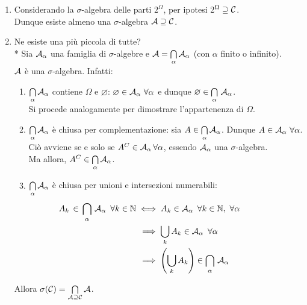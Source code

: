 \begin{dimo}
  \Fixvmode
  \begin{enumerate}
    \item Considerando la $\sigma$-algebra delle parti $2^\Omega$, per ipotesi 2$^\Omega \supseteq \mathcal C$. \\
    Dunque esiste almeno una $\sigma$-algebra $\mathcal A \supseteq \mathcal C$.
    \item Ne esiste una più piccola di tutte? \\*
      Sia $\mathcal A_\alpha$ una famiglia di $\sigma$-algebre e $\mathcal A = \bigcap\limits_{\alpha}^{} \mathcal A_\alpha$ (con $\alpha$ finito o infinito). \\
    $\mathcal A$ è una $\sigma$-algebra. Infatti:
      \begin{enumerate}
        \item $\bigcap\limits_{\alpha} \mathcal A_\alpha$ contiene $\Omega$ e $\varnothing$:  $\varnothing \in \mathcal A_\alpha \ \forall \alpha$ e dunque $\varnothing \in \bigcap\limits_{\alpha}^{} \, \mathcal A_\alpha$. \\
        Si procede analogamente per dimostrare l'appartenenza di $\Omega$.
        \item $\bigcap\limits_{\alpha}^{} \mathcal A_\alpha$ è chiusa per complementazione: sia $A \in \bigcap\limits_{\alpha} \mathcal A_\alpha$.
          Dunque $A \in \mathcal A_\alpha \ \forall \alpha$. \\
      Ciò avviene se e solo se $A^C \in \mathcal A_\alpha \, \forall \alpha$, essendo $\mathcal A_\alpha$ una $\sigma$-algebra. \\
          Ma allora, $A^C \in \bigcap\limits_{\alpha}^{} \mathcal A_\alpha$.
        \item $\bigcap\limits_{\alpha}^{} \mathcal A_\alpha$ è chiusa per unioni e intersezioni numerabili:
          \begin{align*}
            A_k \,\in\, \bigcap_{\alpha} \, \Ac_\alpha \enspace \forall k \in \NN
            &\iff A_k \in \Ac_\alpha \enspace \forall k \in \NN, \ \forall \alpha \qquad \qquad\\
            &\, \implies \bigcup_k A_k \in \Ac_\alpha \enspace \forall \alpha \\
            &\, \implies \left( \bigcup\limits_{k}^{} A_k \right) \in \bigcap\limits_{\alpha}^{} \, \Ac_\alpha
          \end{align*}
      \end{enumerate}
      Allora $\sigma(\mathcal C) = \bigcap\limits_{\mathcal A \supseteq \mathcal C} \mathcal A$. \qedhere
  \end{enumerate}
\end{dimo}
